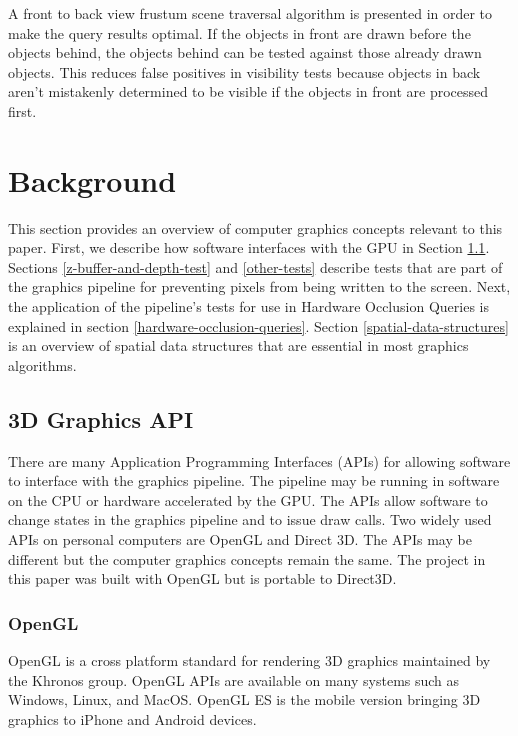 \documentclass[12pt]{ucthesis}
\begin{document}
A front to back view frustum scene traversal algorithm is presented in order to make the query results optimal.
If the objects in front are drawn before the objects behind, the objects behind can be tested against those already drawn objects.
This reduces false positives in visibility tests because objects in back aren't mistakenly determined to be visible if the objects in front are processed first.

\chapter{Background}
\label{background}

This section provides an overview of computer graphics concepts relevant to this paper.
First, we describe how software interfaces with the GPU in Section \ref{3d-graphics-api}.
Sections \ref{z-buffer-and-depth-test} and \ref{other-tests} describe tests that are part of the graphics pipeline for preventing pixels from being written to the screen.
Next, the application of the pipeline's tests for use in Hardware Occlusion Queries is explained in section \ref{hardware-occlusion-queries}.
Section \ref{spatial-data-structures} is an overview of spatial data structures that are essential in most graphics algorithms.

\section{3D Graphics API}
\label{3d-graphics-api}

There are many Application Programming Interfaces (APIs) for allowing software to interface with the graphics pipeline.
The pipeline may be running in software on the CPU or hardware accelerated by the GPU.
The APIs allow software to change states in the graphics pipeline and to issue draw calls.
Two widely used APIs on personal computers are OpenGL and Direct 3D.\cite{about-openGL, about-direct3D}
The APIs may be different but the computer graphics concepts remain the same.
The project in this paper was built with OpenGL but is portable to Direct3D.

\subsection{OpenGL}
\label{openGl}

OpenGL is a cross platform standard for rendering 3D graphics maintained by the Khronos group.\cite{about-openGL}
OpenGL APIs are available on many systems such as Windows, Linux, and MacOS.
OpenGL ES is the mobile version bringing 3D graphics to iPhone and Android devices.\cite{ios-glEs, android-glEs}
\end{document}

